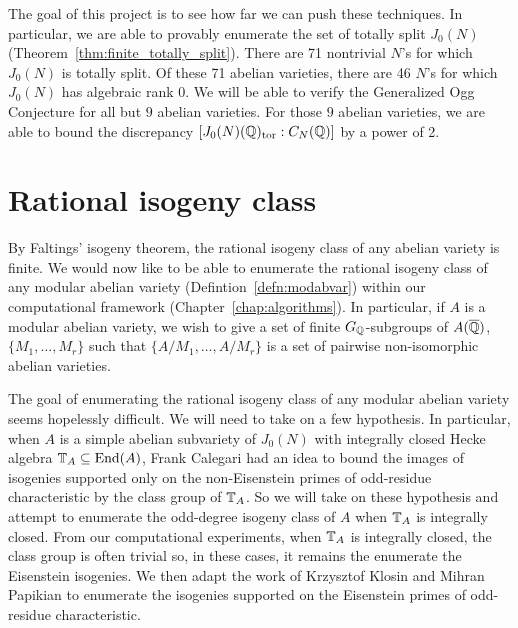The goal of this project is to see how far we can push these techniques. In
particular, we are able to provably enumerate the set of totally split $J_0(N)$
(Theorem~\ref{thm:finite_totally_split}). There are 71 nontrivial $N$'s for
which $J_0(N)$ is totally split. Of these 71 abelian varieties, there are 46
$N$'s for which $J_0(N)$ has algebraic rank 0. We will be able to verify the
Generalized Ogg Conjecture for all but $9$ abelian varieties. For those $9$
abelian varieties, we are able to bound the discrepancy
$[J_0(N)(\mathbb{Q})_{\mathrm{tor}}:C_N(\mathbb{Q})]$ by a power of 2.


\section{Rational isogeny class}%
\label{sec:rational_isogeny_class}

By Faltings' isogeny theorem, the rational isogeny class of any abelian variety
is finite. We would now like to be able to  enumerate the rational isogeny
class of any modular abelian variety (Defintion~\ref{defn:modabvar}) within our
computational framework (Chapter~\ref{chap:algorithms}). In particular, if $A$
is a modular abelian variety, we wish to give a set of finite $G_{\mathbb{Q}}$-subgroups
of $A(\overline{\mathbb{Q}})$, $\{M_1,\ldots,M_r\}$ such that $\{A/M_1,\ldots,A/M_r\}$ is a
set of pairwise non-isomorphic abelian varieties.

The goal of enumerating the rational isogeny class of any modular abelian
variety seems hopelessly difficult. We will need to take on a few hypothesis.
In particular, when $A$ is a simple abelian subvariety of $J_0(N)$ with
integrally closed Hecke algebra $\mathbb{T}_A\subseteq \operatorname{End}(A)$, Frank Calegari had an
idea to bound the images of isogenies supported only on the non-Eisenstein
primes of odd-residue characteristic by the class group of $\mathbb{T}_A$. So we will
take on these hypothesis and attempt to enumerate the odd-degree isogeny class
of $A$ when $\mathbb{T}_A$ is integrally closed. From our computational experiments,
when $\mathbb{T}_A$ is integrally closed, the class group is often trivial so, in
these cases, it remains the enumerate the Eisenstein isogenies. We then adapt
the work of Krzysztof Klosin and Mihran Papikian to enumerate the isogenies
supported on the Eisenstein primes of odd-residue characteristic.
